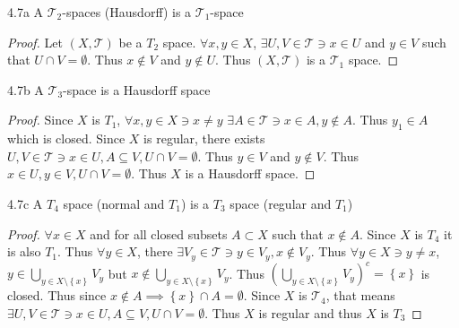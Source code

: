 \documentclass{article}
\newcommand*{\T}{\mathcal{T}}
\begin{document}
\bigskip

\begin{claim}{4.7a}\label{Claim 4.7a.}
    A $\T_2$-spaces (Hausdorff) is a $\T_1$-space  
\end{claim}
\begin{proof}
    Let $(X, \T)$ be a $T_2$ space. $\forall x, y \in X$, $\exists U, V \in \T \ni x \in U$ and $y \in V$ such that $U \cap V = \emptyset$. Thus $x \not \in V$ and $y \not \in U$. Thus $(X, \T)$ is a $\T_1$ space.          
\end{proof}

\begin{claim}{4.7b}\label{Claim 4.7b.}
    A $\T_3$-space is a Hausdorff space 
\end{claim}
\begin{proof}
    Since $X$ is $T_1$, $\forall x, y \in X \ni x \neq y$ $\exists A \in \T \ni x \in A, y \not \in A$. Thus $y_1 \in A$ which is closed. Since $X$ is regular, there exists $U, V \in \T \ni x \in U, A \subseteq V, U \cap V = \emptyset$. Thus $y \in V$ and $y \not \in V$. Thus $x \in U, y \in V, U \cap V = \emptyset$. Thus $X$ is a Hausdorff space.           
\end{proof}

\begin{claim}{4.7c}\label{Claim 4.7c.}
    A $T_4$ space (normal and $T_1$) is a $T_3$ space (regular and $T_1$) 
\end{claim}
\begin{proof}
    $\forall x \in X$ and for all closed subsets $A \subset X$ such that $x \not \in A$. Since $X$ is $T_4$ it is also $T_1$. Thus $\forall y \in X$, there $\exists V_y \in \T \ni y \in V_y, x\not\in V_y$. Thus $\forall y \in X \ni y \neq x$, $y \in \bigcup_{y \in X \setminus \left\{ x \right\}} V_y$ but $x \not \in \bigcup_{y \in X \setminus \left\{ x \right\}} V_y$. Thus $(\bigcup_{y \in X \setminus \left\{ x \right\}} V_y)^c = \left\{ x \right\}$ is closed. Thus since $x \not \in A \implies \left\{ x \right\} \cap A = \emptyset$. Since $X$ is $\T_4$, that means $\exists U, V \in \T \ni x \in U, A \subseteq V, U \cap V = \emptyset$. Thus $X$ is regular and thus $X$ is $T_3$                  
\end{proof}

\bigskip
\end{document}
